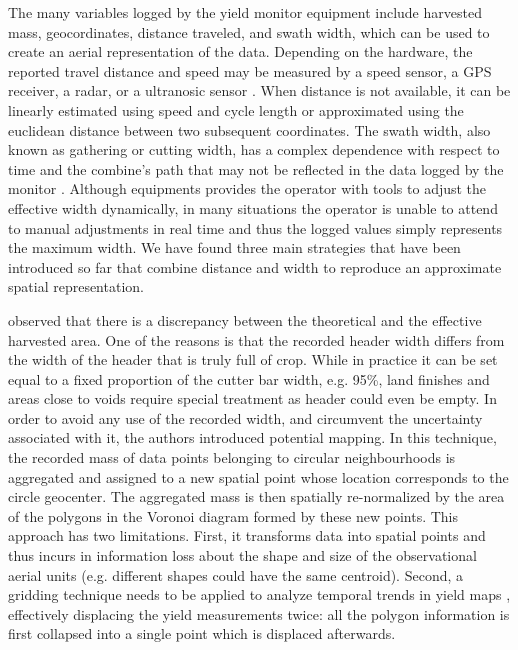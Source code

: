 The many variables logged by the yield monitor equipment include
harvested mass, geocordinates, distance traveled, and swath width,
which can be used to create an aerial representation of the
data. Depending on the hardware, the reported travel distance and
speed may be measured by a speed sensor, a GPS receiver, a radar, or a
ultranosic sensor \citep{Mulla2013}. When distance is not available,
it can be linearly estimated using speed and cycle length or
approximated using the euclidean distance between two subsequent
coordinates. The swath width, also known as gathering or cutting
width, has a complex dependence with respect to time and the combine's
path that may not be reflected in the data logged by the monitor
\citep{Ross2008}. Although equipments provides the operator with tools
to adjust the effective width dynamically, in many situations the
operator is unable to attend to manual adjustments in real time and
thus the logged values simply represents the maximum width. We have
found three main strategies that have been introduced so far that
combine distance and width to reproduce an approximate spatial
representation.

\cite{Blackmore1999} observed that there is a discrepancy between the
theoretical and the effective harvested area. One of the reasons is
that the recorded header width differs from the width of the header
that is truly full of crop. While in practice it can be set equal to a
fixed proportion of the cutter bar width, e.g. 95\%, land finishes and
areas close to voids require special treatment as header could even be
empty. In order to avoid any use of the recorded width, and circumvent
the uncertainty associated with it, the authors introduced potential
mapping. In this technique, the recorded mass of data points belonging
to circular neighbourhoods is aggregated and assigned to a new spatial
point whose location corresponds to the circle geocenter. The
aggregated mass is then spatially re-normalized by the area of the
polygons in the Voronoi diagram formed by these new points. This
approach has two limitations. First, it transforms data into spatial
points and thus incurs in information loss about the shape and size of
the observational aerial units (e.g. different shapes could have the
same centroid). Second, a gridding technique needs to be applied to
analyze temporal trends in yield maps \citep{Blackmore2003},
effectively displacing the yield measurements twice: all the polygon
information is first collapsed into a single point which is displaced
afterwards.

